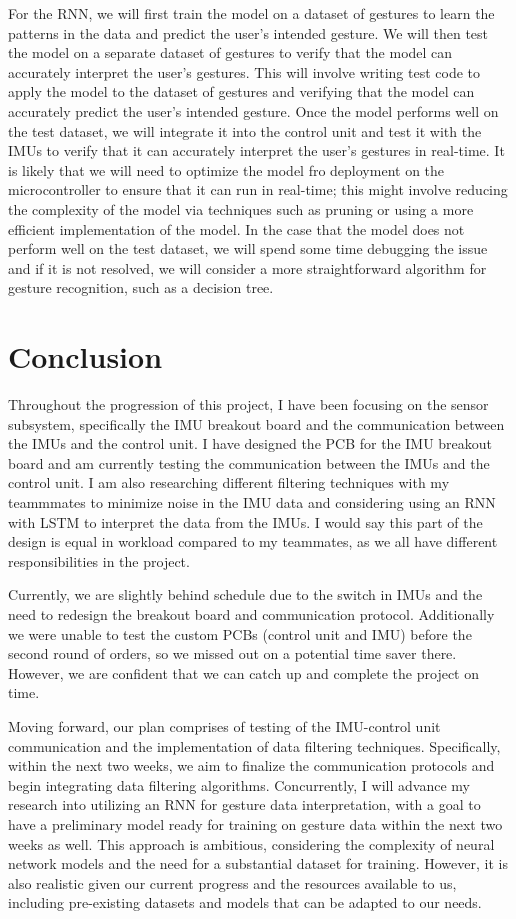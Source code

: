 \documentclass[12pt]{article}
\begin{document}
For the RNN, we will first train the model on a dataset of gestures to learn the patterns in the data and predict the user's intended gesture. We will then test the model on a separate dataset of gestures to verify that the model can accurately interpret the user's gestures. This will involve writing test code to apply the model to the dataset of gestures and verifying that the model can accurately predict the user's intended gesture. Once the model performs well on the test dataset, we will integrate it into the control unit and test it with the IMUs to verify that it can accurately interpret the user's gestures in real-time. It is likely that we will need to optimize the model fro deployment on the microcontroller to ensure that it can run in real-time; this might involve reducing the complexity of the model via techniques such as pruning or using a more efficient implementation of the model. In the case that the model does not perform well on the test dataset, we will spend some time debugging the issue and if it is not resolved, we will consider a more straightforward algorithm for gesture recognition, such as a decision tree.
\section{Conclusion}
Throughout the progression of this project, I have been focusing on the sensor subsystem, specifically the IMU breakout board and the communication between the IMUs and the control unit. I have designed the PCB for the IMU breakout board and am currently testing the communication between the IMUs and the control unit. I am also researching different filtering techniques with my teammmates to minimize noise in the IMU data and considering using an RNN with LSTM to interpret the data from the IMUs. I would say this part of the design is equal in workload compared to my teammates, as we all have different responsibilities in the project. 

Currently, we are slightly behind schedule due to the switch in IMUs and the need to redesign the breakout board and communication protocol. Additionally we were unable to test the custom PCBs (control unit and IMU) before the second round of orders, so we missed out on a potential time saver there. However, we are confident that we can catch up and complete the project on time. 

Moving forward, our plan comprises of testing of the IMU-control unit communication and the implementation of data filtering techniques. Specifically, within the next two weeks, we aim to finalize the communication protocols and begin integrating data filtering algorithms. Concurrently, I will advance my research into utilizing an RNN for gesture data interpretation, with a goal to have a preliminary model ready for training on gesture data within the next two weeks as well. This approach is ambitious, considering the complexity of neural network models and the need for a substantial dataset for training. However, it is also realistic given our current progress and the resources available to us, including pre-existing datasets and models that can be adapted to our needs. 
\end{document}
